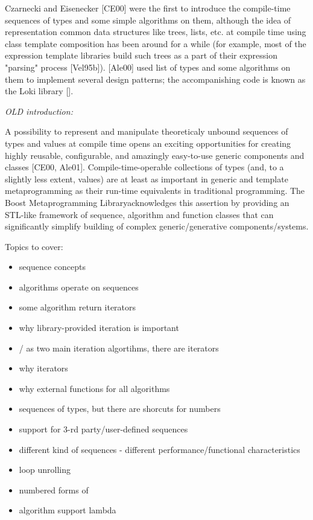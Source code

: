 \documentclass{netobjectdays}
\newcommand{\Mpl}{Boost Meta\-program\-ming Library}
\begin{document}
Czarnecki and Eisenecker [CE00] were the first to introduce 
the compile-time sequences of types and some simple algorithms 
on them, although the idea of representation common data 
structures like trees, lists, etc. at compile time using class 
template composition has been around for a while (for example, 
most of the expression template libraries build such trees as 
a part of their expression "parsing" process [Vel95b]). 
[Ale00] used list of types and some algorithms on them to 
implement several design patterns; the accompanishing code 
is known as the Loki library []. 

\emph{OLD introduction:}

A possibility to represent and manipulate theoreticaly 
unbound sequences of types and values at compile time opens an 
exciting opportunities for creating highly reusable, 
configurable, and amazingly easy-to-use generic components and 
classes [CE00, Ale01]. Compile-time-operable collections of 
types (and, to a slightly less extent, values) are at least as 
important in generic and template metaprogramming as their 
run-time equivalents in traditional programming. 
The \Mpl acknowledges this assertion by providing an 
STL-like framework of sequence, algorithm and function classes 
that can significantly simplify building of complex 
generic/generative components/systems. 

Topics to cover:
\begin{itemize}
  \item sequence concepts
  \item algorithms operate on sequences
  \item some algorithm return iterators
  \item why library-provided iteration is important
  \item {}/ as two main 
    iteration algortihms, there are iterators
  \item why iterators
  \item why external functions for all algorithms
  \item  sequences of types, but there are shorcuts for numbers
  \item support for 3-rd party/user-defined sequences
  \item  different kind of sequences - different 
    performance/functional characteristics
  \item loop unrolling
  \item numbered forms of 
  \item algorithm support lambda
\end{itemize}
\end{document}
